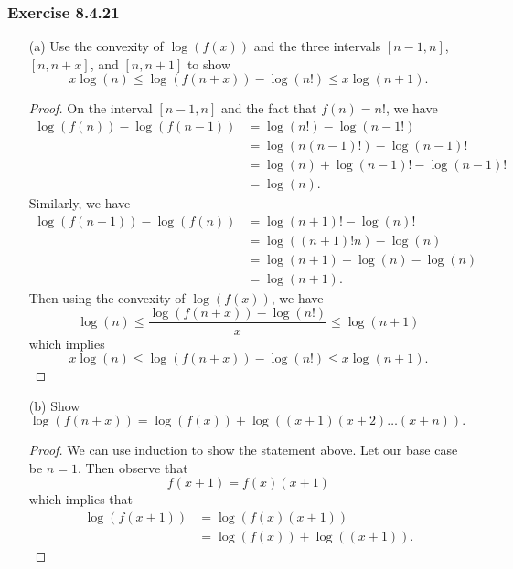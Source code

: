 \subsubsection{Exercise 8.4.21} 
\begin{enumerate}
    \item[(a)] Use the convexity of \( \log(f(x)) \) and the three intervals \( [n-1,n]  \), \( [n,n +x] \), and \( [n,n+1] \) to show 
        \[  x \log(n) \leq \log(f(n+x)) - \log(n!) \leq x \log(n+1). \]
        \begin{proof}
 On the interval \( [n-1,n ] \) and the fact that \( f(n) = n!  \), we have 
            \begin{align*}
                \log(f(n)) - \log(f(n-1))   &= \log(n!) - \log(n-1!)  \\
                                            &= \log(n(n-1)!) - \log(n-1)! \\
                                            &= \log(n) + \log(n-1)! - \log(n-1)! \\
                                            &= \log(n).
            \end{align*}
            Similarly, we have 
            \begin{align*}
                \log(f(n+1)) - \log(f(n)) &= \log(n+1)! - \log(n)! \\
                                          &= \log((n+1)! n) - \log(n) \\
                                          &= \log(n+1) + \log(n) - \log(n) \\
                                          &= \log(n+1).
            \end{align*}
            Then using the convexity of \( \log(f(x))  \), we have 
            \[  \log(n) \leq \frac{ \log(f(n+x)) - \log(n!) }{ x  }  \leq \log(n+1)     \]
            which implies 
            \[  x \log(n) \leq \log(f(n+x)) - \log(n!)  \leq x \log(n+1).   \]
        \end{proof}
        \item[(b)] Show \( \log(f(n+x)) = \log(f(x)) + \log((x+1)(x+2) \dots (x+n)). \)
            \begin{proof}
            We can use induction to show the statement above. Let our base case be \( n = 1  \). Then observe that 
            \[ f(x+1) = f(x)(x+1) \] which implies that 
            \begin{align*}
                \log(f(x+1)) &= \log(f(x)(x+1)) \\
                             &= \log(f(x)) + \log((x+1)).

\end{align*}
\end{proof}
\end{enumerate}
